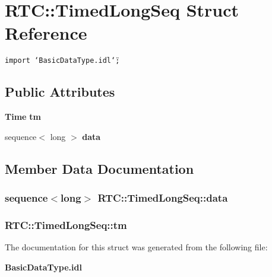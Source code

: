 \section{RTC::Timed\-Long\-Seq Struct Reference}
\label{structRTC_1_1TimedLongSeq}
{\tt import \char`\"{}Basic\-Data\-Type.idl\char`\"{};}

\subsection*{Public Attributes}
\begin{CompactItemize}
\item 
{\bf Time} {\bf tm}
\item 
sequence$<$ long $>$ {\bf data}
\end{CompactItemize}


\subsection{Member Data Documentation}
\subsubsection{\setlength{\rightskip}{0pt plus 5cm}sequence$<$long$>$ {\bf RTC::Timed\-Long\-Seq::data}}\label{structRTC_1_1TimedLongSeq_RTC_1_1TimedLongSeqo1}


\subsubsection{ {\bf RTC::Timed\-Long\-Seq::tm}}\label{structRTC_1_1TimedLongSeq_RTC_1_1TimedLongSeqo0}




The documentation for this struct was generated from the following file:\begin{CompactItemize}
\item 
{\bf Basic\-Data\-Type.idl}\end{CompactItemize}
